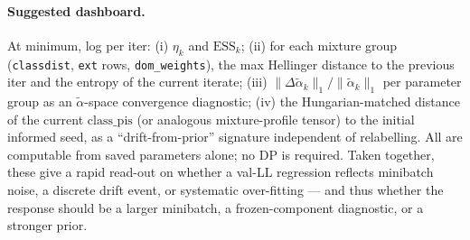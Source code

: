 \paragraph{Suggested dashboard.}
At minimum, log per iter: (i) $\eta_k$ and $\mathrm{ESS}_k$; (ii) for each
mixture group (\texttt{classdist}, \texttt{ext} rows, \texttt{dom\_weights}),
the max Hellinger distance to the previous iter and the entropy of the
current iterate; (iii) $\|\Delta\tilde{\alpha}_k\|_1 / \|\tilde{\alpha}_k\|_1$
per parameter group as an $\tilde{\alpha}$-space convergence diagnostic;
(iv) the Hungarian-matched distance of the current $\mathrm{class\_pis}$ (or
analogous mixture-profile tensor) to the initial informed seed, as a
``drift-from-prior'' signature independent of relabelling.  All are
computable from saved parameters alone; no DP is required.  Taken
together, these give a rapid read-out on whether a val-LL regression
reflects minibatch noise, a discrete drift event, or systematic
over-fitting --- and thus whether the response should be a larger
minibatch, a frozen-component diagnostic, or a stronger prior.


